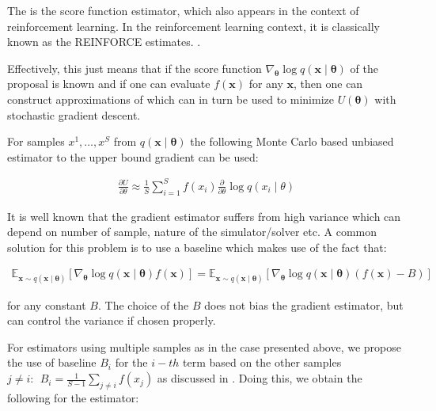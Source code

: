 The  is the score function estimator\cite{glynn1990likelihood}, which also appears in the context of reinforcement learning. In the reinforcement learning context, it is classically known as the REINFORCE estimates. \cite{williams1992simple}. 

Effectively, this just means that if the score function $\nabla_{\boldsymbol{\theta}} \log q(\boldsymbol{x} \mid \boldsymbol{\theta})$ of the proposal is known and if one can evaluate $f(\bm{x})$ for any $\bm{x}$, then one can construct approximations of  which can in turn be used to minimize $U(\boldsymbol{\theta})$ with stochastic gradient descent. 

For samples $x^1, \dotsc, x^S$ from $q(\boldsymbol{x} \mid \boldsymbol{\theta})$  the following Monte Carlo based unbiased estimator to the upper bound gradient can be used:

\begin{align}
    \frac{\partial U}{\partial \theta} \approx \frac{1}{S} \sum_{i=1}^{S} f\left(x_i\right) \frac{\partial}{\partial \theta} \log q\left(x_i \mid \theta\right)
\end{align}

It is well known that the gradient estimator suffers from high variance which can depend on number of sample, nature of the simulator/solver etc. A common solution for this problem is to use a baseline \cite{williams1992simple} which makes use of the fact that:

\begin{align}
    \mathbb{E}_{\boldsymbol{x} \sim q(\boldsymbol{x} \mid \boldsymbol{\theta})}\left[\nabla_{\boldsymbol{\theta}} \log q(\boldsymbol{x} \mid \boldsymbol{\theta}) f(\boldsymbol{x})\right] = \mathbb{E}_{\boldsymbol{x} \sim q(\boldsymbol{x} \mid \boldsymbol{\theta})}\left[\nabla_{\boldsymbol{\theta}} \log q(\boldsymbol{x} \mid \boldsymbol{\theta}) (f(\boldsymbol{x}) - B)\right]
\end{align}

for any constant $B$. The choice of the $B$ does not bias the gradient estimator, but can control the variance if chosen properly. 

For estimators using multiple samples as in the case presented above, we propose the use of baseline $B_i$ for the $i-th$ term based on the other samples $j\neq i: ~~ B_i = \frac{1}{S-1} \sum_{j\neq i}f(x_j)$ as discussed in \cite{kool_buy_2022}. Doing this, we obtain the following for the estimator:

